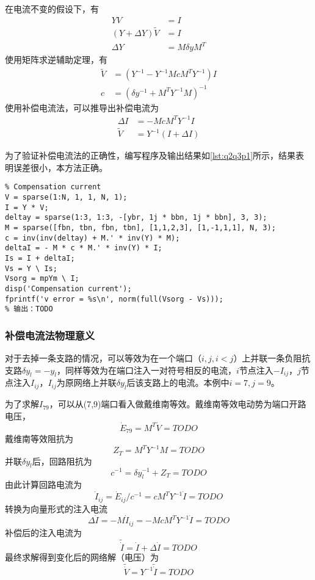 \documentclass[a4paper,12pt]{article}
\begin{document}
    在电流不变的假设下，有
    \begin{equation}
      \begin{aligned}
        YV&=I\\
        (Y+\Delta Y)\widetilde V&=I\\
        \Delta Y&=M\delta y M^T
      \end{aligned}
    \end{equation}
    使用矩阵求逆辅助定理，有
    \begin{equation}
      \begin{aligned}
        \widetilde V&=(Y^{-1}-Y^{-1}McM^TY^{-1})I\\
        c&=(\delta y^{-1}+M^TY^{-1}M)^{-1}
      \end{aligned}
    \end{equation}
    使用补偿电流法，可以推导出补偿电流为
    \begin{equation}
      \begin{aligned}
        \Delta I&=-McM^TY^{-1}I\\
        \widetilde V&=Y^{-1}(I+\Delta I)
      \end{aligned}
    \end{equation}

    为了验证补偿电流法的正确性，编写程序及输出结果如\cref{lst:q2q3p1}所示，结果表明误差很小，本方法正确。
    \begin{lstlisting}[style=Matlab-editor,basicstyle=\mlttfamily,label=lst:q2q3p1,caption={补偿电流法}]
%% Compensation method
% Compensation current
V = sparse(1:N, 1, 1, N, 1);
I = Y * V;
deltay = sparse(1:3, 1:3, -[ybr, 1j * bbn, 1j * bbn], 3, 3);
M = sparse([fbn, tbn, fbn, tbn], [1,1,2,3], [1,-1,1,1], N, 3);
c = inv(inv(deltay) + M.' * inv(Y) * M);
deltaI = - M * c * M.' * inv(Y) * I;
Is = I + deltaI;
Vs = Y \ Is;
Vsorg = mpYm \ I;
disp('Compensation current');
fprintf('v error = %s\n', norm(full(Vsorg - Vs)));
% 输出：TODO
    \end{lstlisting}
    \subsubsection{补偿电流法物理意义}
    对于去掉一条支路的情况，可以等效为在一个端口（$i,j,i<j$）上并联一条负阻抗支路$\delta y_l=-y_l$，同样等效为在端口注入一对符号相反的电流，$i$节点注入$-I_{ij}$，$j$节点注入$I_{ij}$，$I_{ij}$为原网络上并联$\delta y_l$后该支路上的电流。本例中$i=7,j=9$。

    为了求解$I_{79}$，可以从(7,9)端口看入做戴维南等效。戴维南等效电动势为端口开路电压，
    $$\dot E_{79}=M^T \dot V=TODO$$
    戴维南等效阻抗为
    $$Z_T=M^TY^{-1}M=TODO$$
    并联$\delta y_l$后，回路阻抗为
    $$c^{-1}=\delta y_l^{-1}+Z_T=TODO$$
    由此计算回路电流为
    $$\dot I_{ij}=\dot E_{ij}/c^{-1}=cM^TY^{-1}\dot I=TODO$$
    转换为向量形式的注入电流
    $$\Delta \dot I=-M\dot I_{ij}=-McM^TY^{-1}\dot I=TODO$$
    补偿后的注入电流为
    $$\widetilde {\dot I} = \dot I + \Delta \dot I=TODO$$
    最终求解得到变化后的网络解（电压）为
    $$\widetilde {\dot V} = Y^{-1} \widetilde {\dot I} = TODO$$
    \newpage
    
    
    \appendix
\end{document}
